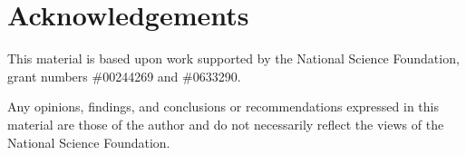 \documentclass{article}
\begin{document}
\section*{Acknowledgements}

This material is based upon work supported by the
National Science Foundation, grant numbers \#00244269 and \#0633290.

Any opinions, findings, and conclusions or recommendations
expressed in this material are those of the author and
do not necessarily reflect the views of the National Science Foundation.
\end{document}
